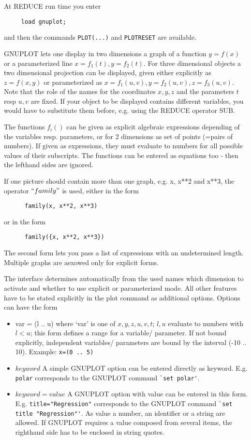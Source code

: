 At {\small REDUCE} run time you enter
\begin{verbatim}
     load gnuplot;
\end{verbatim}

and then the commands \verb+PLOT(...)+ and \verb+PLOTRESET+ are
available.
 
GNUPLOT lets one display in two dimensions a graph of a
function $y=f(x)$ or a parameterized line $x=f_1(t),y=f_2(t)$.
For three dimensional objects a two dimensional projection can
be displayed, given either explicitly as $z=f(x,y)$ or 
parameterized as $x=f_1(u,v),y=f_2(u,v),z=f_3(u,v)$. Note
that the role of the names for the coordinates $x,y,z$ and the 
parameters $t$ resp $u,v$ are fixed. If your object to be
displayed contains different variables, you would have
to substitute them before, e.g. using the 
{\small REDUCE} operator SUB.

The functions $f_i()$ can be given as explicit algebraic 
expressions depending of the variables resp. parameters, or
for 2 dimensions as set of points (=pairs of numbers).
If given as expressions, they must
evaluate to numbers for all possible values of their
subscripts. The functions can be entered as equations
too - then the lefthand sides are ignored.
 
If one picture should contain more than one graph, e.g. x, x**2
and x**3, the operator $``family"$ is used, either in the
form
 
\begin{verbatim}
      family(x, x**2, x**3)
\end{verbatim}
or  in the form
\begin{verbatim}
      family({x, x**2, x**3})
\end{verbatim}
The second form lets you pass a list of expressions with an
undetermined length. Multiple graphs are aexowed only for
explicit forms.
 
The interface determines automatically from the used names 
which dimension to activate and whether
to use explicit or parameterized mode. All other features
have to be stated explicitly in the plot command as
additional options. Options can have the form
 
\begin{itemize}
\item{var = (l .. u)} where `var' is one of $x,y,z,u,v,t$;
   $l,u$ evaluate to numbers with $l<u$; this form defines a range for
   a variable/ parameter. If not bound explicitly, independent
   variables/ parameters are bound by the interval (-10 .. 10).
   Example:  \verb+x=(0 .. 5)+
\item{$keyword$} A simple GNUPLOT option can be entered directly
   as keyword. E.g.  \verb+polar+ corresponds to the GNUPLOT command
   \verb+`set polar'+. 
\item{$keyword=value$} A GNUPLOT option with value can be entered
   in this form. E.g.  \verb+title="Regression"+ corresponds to the
   GNUPLOT command \verb+`set title "Regression"'+. As value
   a number, an identifier or a string are allowed. If GNUPLOT
   requires a value composed from several items, the righthand
   side has to be enclosed in string quotes.
\end{itemize}
 
